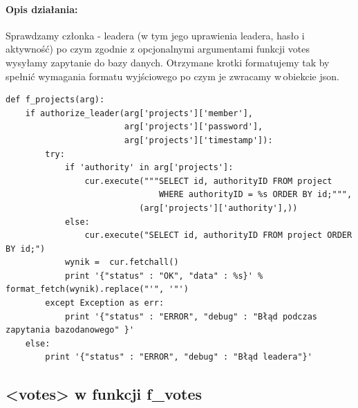\documentclass{article}
\begin{document}
\paragraph{Opis działania: }
Sprawdzamy członka - leadera (w tym jego uprawienia leadera, hasło i aktywność) po czym zgodnie z opcjonalnymi argumentami funkcji votes wysyłamy zapytanie do bazy danych.
Otrzymane krotki formatujemy tak by spełnić wymagania formatu wyjściowego po czym je zwracamy w\,obiekcie json. \newline
\begin{verbatim}
def f_projects(arg):
    if authorize_leader(arg['projects']['member'], 
                        arg['projects']['password'], 
                        arg['projects']['timestamp']):
        try:
            if 'authority' in arg['projects']:
                cur.execute("""SELECT id, authorityID FROM project 
                               WHERE authorityID = %s ORDER BY id;""",
                           (arg['projects']['authority'],))
            else:
                cur.execute("SELECT id, authorityID FROM project ORDER BY id;")
            wynik =  cur.fetchall()
            print '{"status" : "OK", "data" : %s}' % format_fetch(wynik).replace("'", '"')
        except Exception as err:
            print '{"status" : "ERROR", "debug" : "Błąd podczas zapytania bazodanowego" }' 
    else:
        print '{"status" : "ERROR", "debug" : "Błąd leadera"}'  
\end{verbatim}







\newpage
\subsection{<votes> w funkcji f\_votes }
\end{document}
